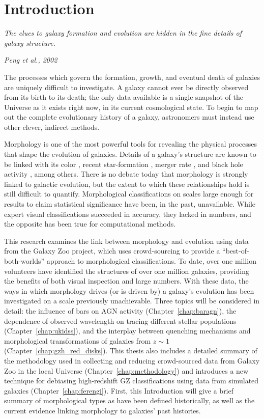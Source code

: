 \chapter{Introduction}
\label{chap:intro}
\epigraph{\textit{The clues to galaxy formation and evolution are hidden in the fine details of galaxy structure.}}{\textit{Peng et al., 2002}}

The processes which govern the formation, growth, and eventual death of galaxies are uniquely difficult to investigate. A galaxy cannot ever be directly observed from its birth to its death; the only data available is a single snapshot of the Universe as it exists right now, in its current cosmological state. To begin to map out the complete evolutionary history of a galaxy, astronomers must instead use other clever, indirect methods.

Morphology is one of the most powerful tools for revealing the physical processes that shape the evolution of galaxies. Details of a galaxy's structure are known to be linked with its color \citep{Tully1982,Strateva2001,Baldry2004}, recent star-formation \citep{Conselice2006,Martin2007,Mignoli2009}, merger rate \citep{Hammer2009,Oesch2010,Smethurst2017}, and black hole activity \citep{Athanassoula1992,Friedli1993,Schawinski2010}, among others. There is no debate today that morphology is strongly linked to galactic evolution, but the extent to which these relationships hold is still difficult to quantify. Morphological classifications on scales large enough for results to claim statistical significance have been, in the past, unavailable. While expert visual classifications succeeded in accuracy, they lacked in numbers, and the opposite has been true for computational methods. 

This research examines the link between morphology and evolution using data from the Galaxy Zoo project, which uses crowd-sourcing to provide a ``best-of-both-worlds'' approach to morphological classifications. To date, over one million volunteers have identified the structures of over one million galaxies, providing the benefits of both visual inspection and large numbers. With these data, the ways in which morphology drives (or is driven by) a galaxy's evolution has been investigated on a scale previously unachievable. Three topics will be considered in detail: the influence of bars on AGN activity (Chapter~\ref{chap:baragn}), the dependence of observed wavelength on tracing different stellar populations (Chapter~\ref{chap:ukidss}), and the interplay between quenching mechanisms and morphological transformations of galaxies from $z\sim1$ (Chapter~\ref{chap:gzh_red_disks}). This thesis also includes a detailed summary of the methodology used in collecting and reducing crowd-sourced data from Galaxy Zoo in the local Universe (Chapter~\ref{chap:methodology}) and introduces a new technique for debiasing high-redshift GZ classifications using data from simulated galaxies (Chapter~\ref{chap:ferengi}). First, this Introduction will give a brief summary of morphological types as have been defined historically, as well as the current evidence linking morphology to galaxies' past histories. 
 

